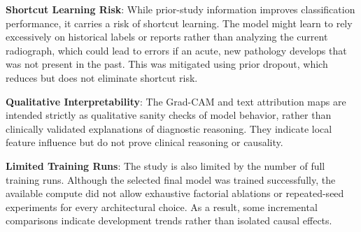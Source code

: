 \textbf{Shortcut Learning Risk}: While prior-study information improves classification performance, it carries a risk of shortcut learning. The model might learn to rely excessively on historical labels or reports rather than analyzing the current radiograph, which could lead to errors if an acute, new pathology develops that was not present in the past. This was mitigated using prior dropout, which reduces but does not eliminate shortcut risk.

\textbf{Qualitative Interpretability}: The Grad-CAM and text attribution maps are intended strictly as qualitative sanity checks of model behavior, rather than clinically validated explanations of diagnostic reasoning. They indicate local feature influence but do not prove clinical reasoning or causality.

\textbf{Limited Training Runs}: The study is also limited by the number of full training runs. Although the selected final model was trained successfully, the available compute did not allow exhaustive factorial ablations or repeated-seed experiments for every architectural choice. As a result, some incremental comparisons indicate development trends rather than isolated causal effects.
